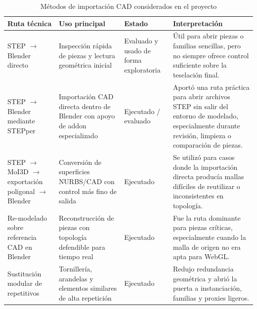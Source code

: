 \begin{table}[p]
    \caption{Métodos de importación CAD considerados en el proyecto}
    \label{tab:metodos_importacion_cad}
    \centering
    \footnotesize
    \setlength{\tabcolsep}{3pt}
    \renewcommand{\arraystretch}{0.82}
    \begin{tabular}{>{\RaggedRight\arraybackslash}p{3.0cm}>{\RaggedRight\arraybackslash}p{3.25cm}>{\RaggedRight\arraybackslash}p{2.15cm}>{\RaggedRight\arraybackslash}p{4.85cm}}
        \hline
        \textbf{Ruta técnica} & \textbf{Uso principal} & \textbf{Estado} & \textbf{Interpretación} \\ \hline
        STEP $\rightarrow$ Blender directo & Inspección rápida de piezas y lectura geométrica inicial & Evaluado y usado de forma exploratoria & Útil para abrir piezas o familias sencillas, pero no siempre ofrece control suficiente sobre la teselación final. \\
        STEP $\rightarrow$ Blender mediante STEPper & Importación CAD directa dentro de Blender con apoyo de addon especializado & Ejecutado / evaluado & Aportó una ruta práctica para abrir archivos STEP sin salir del entorno de modelado, especialmente durante revisión, limpieza o comparación de piezas. \\
        STEP $\rightarrow$ MoI3D $\rightarrow$ exportación poligonal $\rightarrow$ Blender & Conversión de superficies NURBS/CAD con control más fino de salida & Ejecutado & Se utilizó para casos donde la importación directa producía mallas difíciles de reutilizar o inconsistentes en topología. \\
        Re-modelado sobre referencia CAD en Blender & Reconstrucción de piezas con topología defendible para tiempo real & Ejecutado & Fue la ruta dominante para piezas críticas, especialmente cuando la malla de origen no era apta para WebGL. \\
        Sustitución modular de repetitivos & Tornillería, arandelas y elementos similares de alta repetición & Ejecutado & Redujo redundancia geométrica y abrió la puerta a instanciación, familias y proxies ligeros. \\ \hline
    \end{tabular}
    \par\vspace{0.5\baselineskip}
\end{table}

